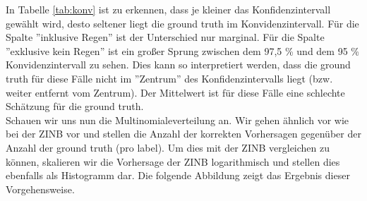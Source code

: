 \noindent In Tabelle \ref{tab:konv} ist zu erkennen, dass je kleiner das Konfidenzintervall gewählt wird, desto seltener liegt die ground truth im Konvidenzintervall.
Für die Spalte ''inklusive Regen'' ist der Unterschied nur marginal. Für die Spalte ''exklusive kein Regen'' ist ein großer Sprung zwischen dem 97,5 \% und dem 95 \% Konvidenzintervall zu sehen.
Dies kann so interpretiert werden, dass die ground truth für diese Fälle nicht im ''Zentrum'' des Konfidenzintervalls liegt (bzw. weiter entfernt vom Zentrum). Der Mittelwert ist für diese Fälle eine schlechte Schätzung für die ground truth.\\

\noindent Schauen wir uns nun die Multinomialeverteilung an. Wir gehen ähnlich vor wie bei der ZINB vor und stellen die Anzahl der korrekten Vorhersagen gegenüber der Anzahl der ground truth (pro label). Um dies mit der ZINB vergleichen zu können, skalieren wir die Vorhersage der ZINB logarithmisch und stellen dies ebenfalls als Histogramm dar. Die folgende Abbildung zeigt das Ergebnis dieser Vorgehensweise.\\


